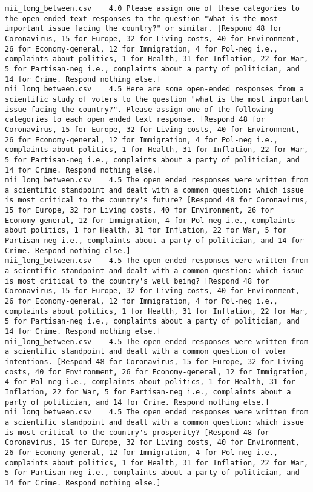 \begin{lstlisting}[label=lst:promptvariants]
mii_long_between.csv	4.0	Please assign one of these categories to the open ended text responses to the question "What is the most important issue facing the country?" or similar. [Respond 48 for Coronavirus, 15 for Europe, 32 for Living costs, 40 for Environment, 26 for Economy-general, 12 for Immigration, 4 for Pol-neg i.e., complaints about politics, 1 for Health, 31 for Inflation, 22 for War, 5 for Partisan-neg i.e., complaints about a party of politician, and 14 for Crime. Respond nothing else.]
mii_long_between.csv	4.5	Here are some open-ended responses from a scientific study of voters to the question "what is the most important issue facing the country?". Please assign one of the following categories to each open ended text response. [Respond 48 for Coronavirus, 15 for Europe, 32 for Living costs, 40 for Environment, 26 for Economy-general, 12 for Immigration, 4 for Pol-neg i.e., complaints about politics, 1 for Health, 31 for Inflation, 22 for War, 5 for Partisan-neg i.e., complaints about a party of politician, and 14 for Crime. Respond nothing else.]
mii_long_between.csv	4.5	The open ended responses were written from a scientific standpoint and dealt with a common question: which issue is most critical to the country's future? [Respond 48 for Coronavirus, 15 for Europe, 32 for Living costs, 40 for Environment, 26 for Economy-general, 12 for Immigration, 4 for Pol-neg i.e., complaints about politics, 1 for Health, 31 for Inflation, 22 for War, 5 for Partisan-neg i.e., complaints about a party of politician, and 14 for Crime. Respond nothing else.]
mii_long_between.csv	4.5	The open ended responses were written from a scientific standpoint and dealt with a common question: which issue is most critical to the country's well being? [Respond 48 for Coronavirus, 15 for Europe, 32 for Living costs, 40 for Environment, 26 for Economy-general, 12 for Immigration, 4 for Pol-neg i.e., complaints about politics, 1 for Health, 31 for Inflation, 22 for War, 5 for Partisan-neg i.e., complaints about a party of politician, and 14 for Crime. Respond nothing else.]
mii_long_between.csv	4.5	The open ended responses were written from a scientific standpoint and dealt with a common question of voter intentions. [Respond 48 for Coronavirus, 15 for Europe, 32 for Living costs, 40 for Environment, 26 for Economy-general, 12 for Immigration, 4 for Pol-neg i.e., complaints about politics, 1 for Health, 31 for Inflation, 22 for War, 5 for Partisan-neg i.e., complaints about a party of politician, and 14 for Crime. Respond nothing else.]
mii_long_between.csv	4.5	The open ended responses were written from a scientific standpoint and dealt with a common question: which issue is most critical to the country's prosperity? [Respond 48 for Coronavirus, 15 for Europe, 32 for Living costs, 40 for Environment, 26 for Economy-general, 12 for Immigration, 4 for Pol-neg i.e., complaints about politics, 1 for Health, 31 for Inflation, 22 for War, 5 for Partisan-neg i.e., complaints about a party of politician, and 14 for Crime. Respond nothing else.]

\end{lstlisting}
